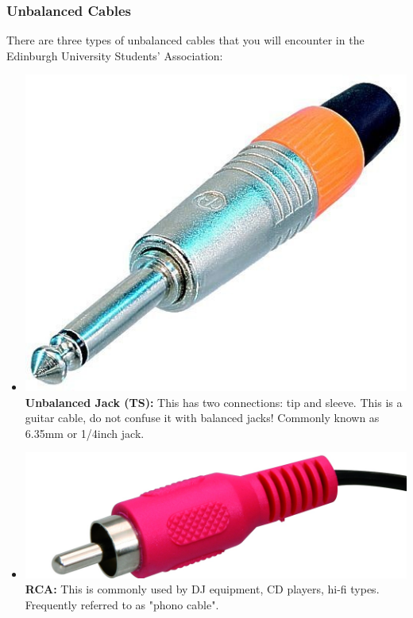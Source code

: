 \documentclass[14pt]{article} %
\begin{document}
\subsubsection{Unbalanced Cables}
\label{unbalanced-cables} 
There are three types of unbalanced cables that you will encounter in the Edinburgh University Students' Association:


\begin{itemize}

\item \includegraphics[scale=0.22]{jack_ts.jpg}\textbf{Unbalanced Jack (TS):} This has two connections: tip and sleeve. This is a guitar cable, do not confuse it with balanced jacks! Commonly known as 6.35mm or 1/4inch jack.

\item \includegraphics[scale=0.11]{rca.jpg}\textbf{RCA:} This is commonly used by DJ equipment, CD players, hi-fi types. Frequently referred to as "phono cable".


\end{itemize}
\end{document}
